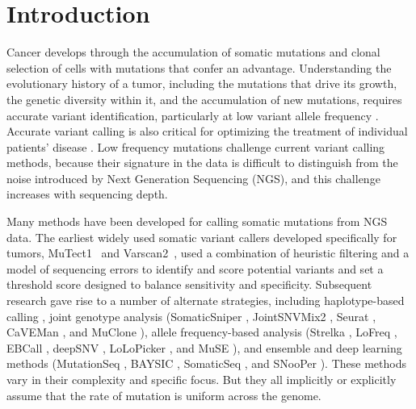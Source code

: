 \documentclass[a4,center,fleqn]{NAR}
\begin{document}
\section{Introduction}

Cancer develops through the accumulation of somatic mutations and clonal selection of cells with mutations that confer an advantage.
Understanding the evolutionary history of a tumor, including the mutations that drive its growth, the genetic diversity within it, and the accumulation of new mutations, requires accurate variant identification, particularly at low variant allele frequency \cite{Williams2016,Bozic2016,Williams2018,Shi2018}.
Accurate variant calling is also critical for optimizing the treatment of individual patients' disease \citep{Ding2012,Mardis2012,Chen2013,Borad2014,Findlay2016}.
Low frequency mutations challenge current variant calling methods, because their signature in the data is difficult to distinguish from the noise introduced by Next Generation Sequencing (NGS), and this challenge increases with sequencing depth.

Many methods have been developed for calling somatic mutations from NGS data.
The earliest widely used somatic variant callers developed specifically for tumors, MuTect1~\cite{Cibulskis2013} and Varscan2~\cite{Koboldt2012}, used a combination of heuristic filtering and a model of sequencing errors to identify and score potential variants and set a threshold score designed to balance sensitivity and specificity.
Subsequent research gave rise to a number of alternate strategies, including haplotype-based calling \citep{Garrison2012},
joint genotype analysis (SomaticSniper \citep{Larson2012}, JointSNVMix2 \citep{Roth2012a}, Seurat \citep{Christoforides2013}, CaVEMan \citep{Jones2016}, and MuClone \citep{Dorri2019}), allele frequency-based analysis (Strelka \citep{Saunders2012}, LoFreq \citep{Wilm2012}, EBCall \citep{Shiraishi2013b}, deepSNV \citep{Gerstung2012}, LoLoPicker \citep{Carrot-Zhang2017}, and MuSE \citep{Fan2016}), and ensemble and deep learning methods (MutationSeq \citep{Ding2012}, BAYSIC \citep{Cantarel2014}, SomaticSeq \citep{Fang2015}, and SNooPer \citep{Spinella2016}).
These methods vary in their complexity and specific focus.
But they all implicitly or explicitly assume that the rate of mutation is uniform across the genome.
\end{document}
